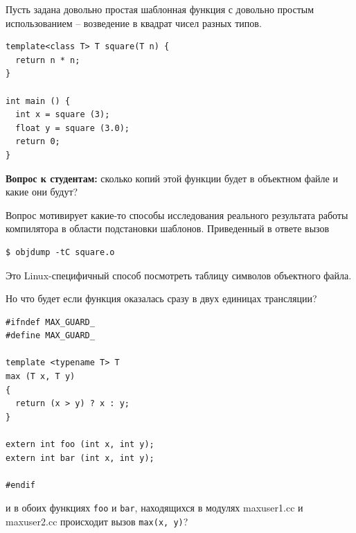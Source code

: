 \documentclass[a4paper,12pt,oneside]{book}
\newif\ifanswers
\begin{document}
Пусть задана довольно простая шаблонная функция с довольно простым использованием -- возведение в квадрат чисел разных типов.

\begin{lstlisting}
template<class T> T square(T n) {
  return n * n;
}

int main () {
  int x = square (3);
  float y = square (3.0);
  return 0;
}
\end{lstlisting}

\textbf{Вопрос к студентам:} сколько копий этой функции будет в объектном файле и какие они будут?

\ifanswers
В вопросе конечно есть подвох:

\begin{verbatim}
$ g++ -c square.cc
$ objdump -tC square.o
\end{verbatim}

даёт 

\begin{verbatim}
_Z6squareIiET_S0_
_Z6squareIdET_S0_ 
\end{verbatim}

Что соответствует:

\begin{lstlisting}
int square<int>(int);
double square<double>(double);
\end{lstlisting}
\fi

Вопрос мотивирует какие-то способы исследования реального результата работы компилятора в области подстановки шаблонов. Приведенный в ответе вызов

\begin{verbatim}
$ objdump -tC square.o
\end{verbatim}

Это Linux-специфичный способ посмотреть таблицу символов объектного файла.

Но что будет если функция оказалась сразу в двух единицах трансляции?

\begin{lstlisting}
#ifndef MAX_GUARD_
#define MAX_GUARD_

template <typename T> T
max (T x, T y)
{
  return (x > y) ? x : y;
}

extern int foo (int x, int y);
extern int bar (int x, int y);

#endif
\end{lstlisting}

и в обоих функциях \lstinline!foo! и \lstinline!bar!, находящихся в модулях maxuser1.cc и maxuser2.cc происходит вызов \lstinline!max(x, y)!?
\end{document}
